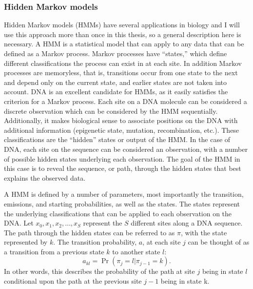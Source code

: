 \subsubsection{Hidden Markov models}
Hidden Markov models (HMMs) have several applications in biology and I will use this approach more than once in this thesis, so a general description here is necessary.
A HMM is a statistical model that can apply to any data that can be defined as a Markov process.
Markov processes have ``states,'' which define different classifications the process can exist in at each site.
In addition Markov processes are memoryless, that is, transitions occur from one state to the next and depend only on the current state, and earlier states are not taken into account.
DNA is an excellent candidate for HMMs, as it easily satisfies the criterion for a Markov process.
Each site on a DNA molecule can be considered a discrete observation which can be considered by the HMM sequentially.
Additionally, it makes biological sense to associate positions on the DNA with additional information (epigenetic state, mutation, recombination, etc.).
These classifications are the ``hidden'' states or output of the HMM.
In the case of DNA, each site on the sequence can be considered an observation, with a number of possible hidden states underlying each observation.
The goal of the HMM in this case is to reveal the sequence, or path, through the hidden states that best explains the observed data.



A HMM is defined by a number of parameters, most importantly the transition, emissions, and starting probabilities, as well as the states.
The states represent the underlying classifications that can be applied to each observation on the DNA.
Let $x_0,x_1,x_2,\dots,x_S$ represent the $S$ different sites along a DNA sequence.
The path through the hidden states can be referred to as $\pi$, with the state represented by $k$.
The transition probability, $a$, at each site $j$ can be thought of as a transition from a previous state $k$ to another state $l$:
\begin{equation}
    a_{kl} = \Pr( \pi_j = l | \pi_{j-1} = k ) .
\end{equation}
In other words, this describes the probability of the path at site $j$ being in state $l$ conditional upon the path at the previous site $j-1$ being in state k.

